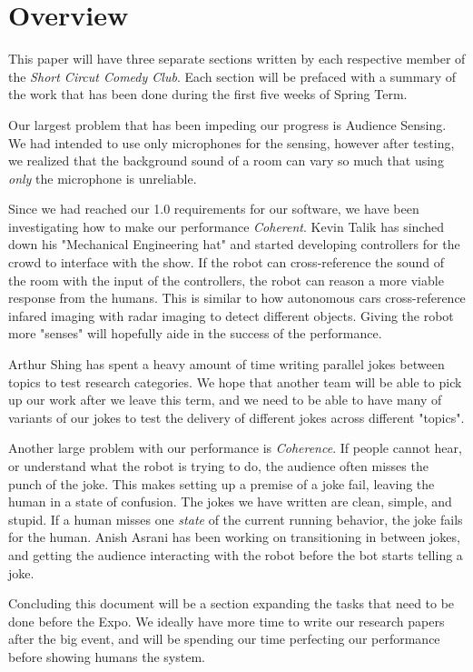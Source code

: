 \documentclass[onecolumn, draftclsnofoot,10pt, compsoc]{IEEEtran}
\begin{document}
\section{Overview}
	This paper will have three separate sections written by each respective member of the \textit{Short Circut Comedy Club}. 
Each section will be prefaced with a summary of the work that has been done during the first five weeks of Spring Term.


Our largest problem that has been impeding our progress is Audience Sensing. 
We had intended to use only microphones for the sensing, however after testing, we realized that the background sound of a room can vary so much that using \textit{only} the microphone is unreliable.

Since we had reached our 1.0 requirements for our software, we have been investigating how to make our performance \textit{Coherent}. Kevin Talik has sinched down his "Mechanical Engineering hat" and started developing controllers for the crowd to interface with the show. If the robot can cross-reference the sound of the room with the input of the controllers, the robot can reason a more viable response from the humans. This is similar to how autonomous cars cross-reference infared imaging with radar imaging to detect different objects. Giving the robot more "senses" will hopefully aide in the success of the performance.

Arthur Shing has spent a heavy amount of time writing parallel jokes between topics to test research categories. We hope that another team will be able to pick up our work after we leave this term, and we need to be able to have many of variants of our jokes to test the delivery of different jokes across different "topics".

Another large problem with our performance is \textit{Coherence}. If people cannot hear, or understand what the robot is trying to do, the audience often misses the punch of the joke.
This makes setting up a premise of a joke fail, leaving the human in a state of confusion. The jokes we have written are clean, simple, and stupid. If a human misses one \textit{state} of the current running behavior, the joke fails for the human.
Anish Asrani has been working on transitioning in between jokes, and getting the audience interacting with the robot before the bot starts telling a joke.

Concluding this document will be a section expanding the tasks that need to be done before the Expo. We ideally have more time to write our research papers after the big event, and will be spending our time perfecting our performance before showing humans the system.
\end{document}

